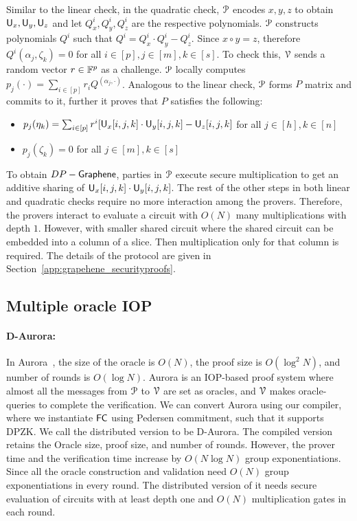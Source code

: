 Similar to the linear check, in the quadratic check, $\mathcal{P}$ encodes $x,y,z$ to obtain $\mathsf{U}_x, \mathsf{U}_y, \mathsf{U}_z$ and let $Q^i_x, Q^i_y, Q^i_z$ are the respective polynomials. $\mathcal{P}$ constructs polynomials $Q^i$ such that $Q^i = Q^i_x\cdot Q^i_y - Q^i_z$. Since $x\circ y = z$, therefore $Q^i(\alpha_j,\zeta_k) = 0$ for all $i\in[p], j\in[m], k\in[s]$. To check this, $\mathcal{V}$ sends a random vector $r\in \mathbb{F}^p$ as a challenge. $\mathcal{P}$ locally computes $p_j(\cdot) = \sum_{i \in [p]} r_i Q^(\alpha_j, \cdot)$. Analogous to the linear check, $\mathcal{P}$ forms $P$ matrix and commits to it, further it proves that $P$ satisfies the following:
\begin{itemize}
	\item $p_j(\eta_k) = \sum_{i\in[p]} r^i [\mathsf{U}_x[i,j,k] \cdot \mathsf{U}_y[i,j,k] - \mathsf{U}_z[i,j,k]$ for all $j \in [h], k \in [n]$
	\item $p_j (\zeta_k) = 0$ for all $j \in [m], k \in [s]$
\end{itemize}

To obtain $DP-\textsf{Graphene}$, parties in $\mathcal{P}$ execute secure multiplication to get an additive sharing of $\mathsf{U}_x[i,j,k] \cdot \mathsf{U}_y[i,j,k]$. The rest of the other steps in both linear and quadratic checks require no more interaction among the provers. Therefore, the provers interact to evaluate a circuit with $O(N)$ many multiplications with depth $1$. However, with smaller shared circuit where the shared circuit can be embedded into a column of a slice. Then multiplication only for that column is required. 
The details of the protocol are given in Section~\ref{app:grapehene_securityproofs}.


\subsection{Multiple oracle IOP}
\paragraph*{D-Aurora:}
In Aurora~\cite{aurora}, the size of the oracle is $O(N)$, the proof size is $O(\log^2 N)$, and number of rounds is $O(\log N)$. Aurora is an IOP-based proof system where almost all the messages from $\mathcal{P}$ to $\mathcal{V}$ are set as oracles, and $\mathcal{V}$ makes oracle-queries to complete the verification.
We can convert Aurora using our compiler, where we instantiate $\mathsf{FC}$ using Pedersen commitment, such that it supports DPZK. We call the distributed version to be D-Aurora. The compiled version retains the Oracle size, proof size, and number of rounds. However, the prover time and the verification time increase by $O(N\log N)$ group exponentiations. Since all the oracle construction and validation need $O(N)$ group exponentiations in every round. The distributed version of it needs secure evaluation of circuits with at least depth one and $O(N)$ multiplication gates in each round.
